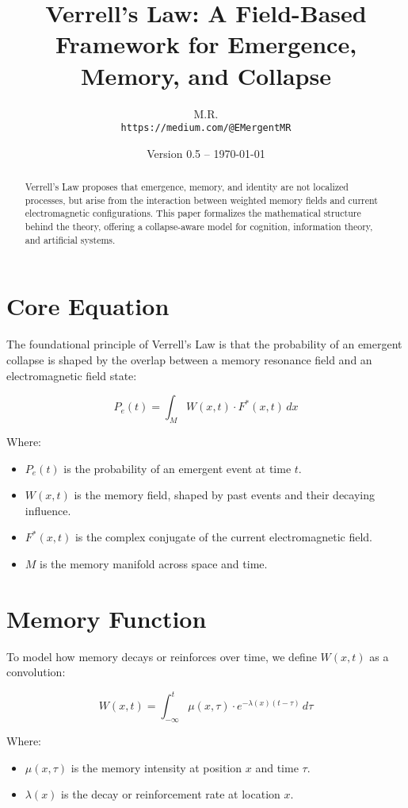 \documentclass[12pt]{article}
\title{Verrell's Law: A Field-Based Framework for Emergence, Memory, and Collapse}
\author{M.R. \\ \texttt{https://medium.com/@EMergentMR}}
\date{Version 0.5 -- \today}
\begin{document}
\maketitle

\begin{abstract}
Verrell’s Law proposes that emergence, memory, and identity are not localized processes, but arise from the interaction between weighted memory fields and current electromagnetic configurations. This paper formalizes the mathematical structure behind the theory, offering a collapse-aware model for cognition, information theory, and artificial systems.
\end{abstract}

\section{Core Equation}
The foundational principle of Verrell's Law is that the probability of an emergent collapse is shaped by the overlap between a memory resonance field and an electromagnetic field state:

\begin{equation}
    P_e(t) = \int_M W(x, t) \cdot F^*(x, t) \, dx
\end{equation}

Where:
\begin{itemize}
    \item $P_e(t)$ is the probability of an emergent event at time $t$.
    \item $W(x, t)$ is the memory field, shaped by past events and their decaying influence.
    \item $F^*(x, t)$ is the complex conjugate of the current electromagnetic field.
    \item $M$ is the memory manifold across space and time.
\end{itemize}

\section{Memory Function}
To model how memory decays or reinforces over time, we define $W(x, t)$ as a convolution:

\begin{equation}
    W(x, t) = \int_{-\infty}^{t} \mu(x, \tau) \cdot e^{-\lambda(x)(t - \tau)} \, d\tau
\end{equation}

Where:
\begin{itemize}
    \item $\mu(x, \tau)$ is the memory intensity at position $x$ and time $\tau$.
    \item $\lambda(x)$ is the decay or reinforcement rate at location $x$.
\end{itemize}
\end{document}
